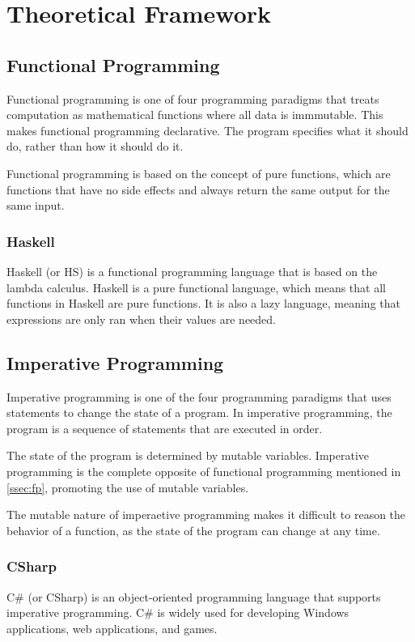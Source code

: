 \section{Theoretical Framework}

\subsection{Functional Programming}
\label{ssec:fp}
Functional programming is one of four programming paradigms that treats computation as mathematical
functions where all data is immmutable.\cite{hudak1989conception} This makes functional programming
declarative. The program specifies what it should do, rather than how it should do it.

Functional programming is based on the concept of pure functions, which are functions
that have no side effects and always return the same output for the same input.

 \subsubsection*{Haskell}
 Haskell (or HS) is a functional programming language that is based on the lambda calculus.\cite{hutton2016programming}
 Haskell is a pure functional language, which means that all functions in Haskell are pure functions.
 It is also a lazy language, meaning that expressions are only ran when their values are needed.

 \subsection{Imperative Programming}

 Imperative programming is one of the four programming paradigms that uses statements to change
 the state of a program. In imperative programming, the program is a sequence of statements that
 are executed in order.\cite{syme2007introducing}

 The state of the program is determined by mutable variables. Imperative programming is the
 complete opposite of functional programming mentioned in \autoref{ssec:fp},
 promoting the use of mutable variables.

 The mutable nature of imperaetive programming makes it difficult to reason the behavior of
 a function, as the state of the program can change at any time.

 \subsubsection*{CSharp}
 C\# (or CSharp) is an object-oriented programming language that supports imperative programming.
 C\# is widely used for developing Windows applications, web applications, and games.

